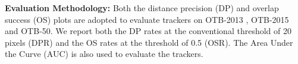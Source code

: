 \documentclass[runningheads]{llncs}
\begin{document}

\noindent \textbf{Evaluation Methodology:} Both the distance precision (DP) and overlap success (OS) plots are adopted to evaluate trackers on OTB-2013 \cite{OTB50}, OTB-2015 \cite{OTB100} and OTB-50. We report both the DP rates at the conventional threshold of 20 pixels (DPR) and the OS rates at the threshold of 0.5 (OSR). The Area Under the Curve (AUC) is also used to evaluate the trackers. \\
\end{document}
